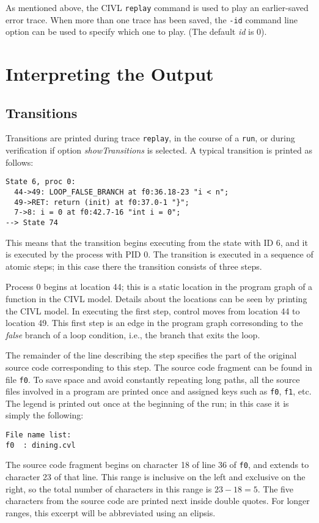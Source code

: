 As mentioned above, the CIVL \texttt{replay} command is used to play
an earlier-saved error trace.  When more than one trace has been
saved, the \texttt{-id} command line option can be used to specify
which one to play. (The default \emph{id} is 0).

\chapter{Interpreting the Output}

\section{Transitions}

Transitions are printed during trace \texttt{replay}, in the course of
a \texttt{run}, or during verification if option
\emph{showTransitions} is selected.  A typical transition is printed
as follows:

\begin{verbatim}
State 6, proc 0: 
  44->49: LOOP_FALSE_BRANCH at f0:36.18-23 "i < n";
  49->RET: return (init) at f0:37.0-1 "}";
  7->8: i = 0 at f0:42.7-16 "int i = 0";
--> State 74
\end{verbatim}

This means that the transition begins executing from the state with
ID 6, and it is executed by the process with PID 0.  The transition
is executed in a sequence of atomic steps; in this case there the
transition consists of three steps.

Process 0 begins at location 44; this is a static location in the
program graph of a function in the CIVL model.  Details about the
locations can be seen by printing the CIVL model.  In executing the
first step, control moves from location 44 to location 49.  This first
step is an edge in the program graph corresonding to the \emph{false}
branch of a loop condition, i.e., the branch that exits the loop.

The remainder of the line describing the step specifies the part of
the original source code corresponding to this step.  The source code
fragment can be found in file \texttt{f0}.  To save space and avoid
constantly repeating long paths, all the source files involved in a
program are printed once and assigned keys such as \texttt{f0},
\texttt{f1}, etc.  The legend is printed out once at the beginning of
the run; in this case it is simply the following:
\begin{verbatim}
File name list:
f0	: dining.cvl
\end{verbatim}
The source code fragment begins on character 18 of line 36 of
\texttt{f0}, and extends to character 23 of that line.  This range is
inclusive on the left and exclusive on the right, so the total number
of characters in this range is $23-18=5$.  The five characters from
the source code are printed next inside double quotes.  For longer
ranges, this excerpt will be abbreviated using an elipsis.

